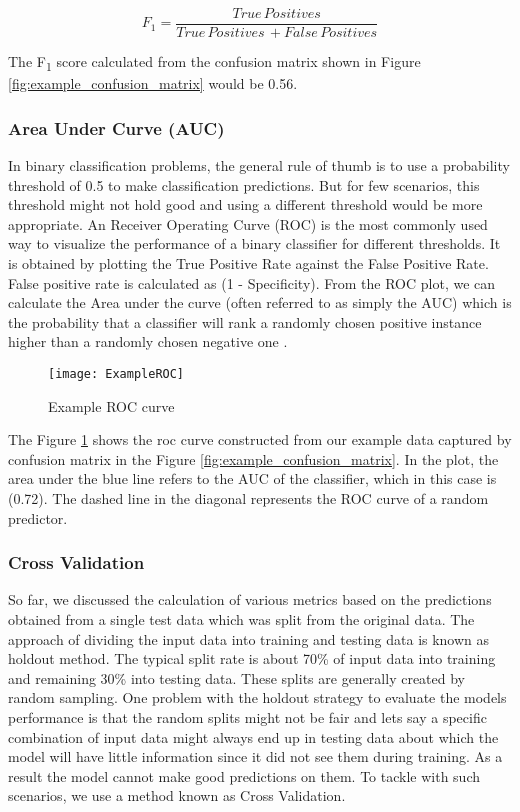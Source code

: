 \documentclass[11pt,openright]{report}
\begin{document}
\begin{equation}
F_{1} = \dfrac{True\, Positives }{True\, Positives\, + False\, Positives} \label{eq:Precision} 
 \end{equation}

The F\textsubscript{1} score calculated from the confusion matrix shown in Figure \ref{fig:example_confusion_matrix} would be 0.56.


\subsubsection{Area Under Curve (AUC)}

In binary classification problems, the general rule of thumb is to use a probability threshold of 0.5 to make classification predictions. But for few scenarios, this threshold might not hold good and using a different threshold would be more appropriate. An Receiver Operating Curve (ROC) is the most commonly used way to visualize the performance of a binary classifier for different thresholds. It is obtained by plotting the True Positive Rate against the False Positive Rate. False positive rate is calculated as (1 - Specificity). From the ROC plot, we can calculate the Area under the curve (often referred to as simply the AUC) which is the probability that a classifier will rank a randomly chosen positive instance higher than a randomly chosen negative one \cite{fawcett2006introduction}.


  \begin{figure}[!htbp]
	\centering
	\texttt{[image: ExampleROC]}
	\caption{Example ROC curve}
	\label{fig:example_roc}
\end{figure} 

The Figure \ref{fig:example_roc} shows the roc curve constructed from our example data captured by confusion matrix in the Figure \ref{fig:example_confusion_matrix}. In the plot, the area under the blue line refers to the AUC of the classifier, which in this case is (0.72). The dashed line in the diagonal represents the ROC curve of a random predictor.

\subsubsection{Cross Validation}
So far, we discussed the calculation of various metrics based on the predictions obtained from a single test data which was split from the original data. The approach of dividing the input data into training and testing data is known as holdout method. The typical split rate is about 70\% of input data into training and remaining 30\% into testing data. These splits are generally created by random sampling. One problem with the holdout strategy to evaluate the models performance is that the random splits might not be fair and lets say a specific combination of input data might always end up in testing data about which the model will have little information since it did not see them during training. As a result the model cannot make good predictions on them. To tackle with such scenarios, we use a method known as Cross Validation. 
\end{document}
